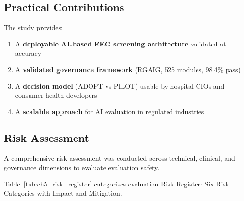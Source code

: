 \subsection{Practical Contributions}

The study provides:

\begin{enumerate}[label=(\alph*)]
    \item A \textbf{deployable AI-based EEG screening architecture} validated at \asdacc{} accuracy
    \item A \textbf{validated governance framework} (RGAIG, 525 modules, 98.4\% pass)
    \item A \textbf{decision model} (ADOPT vs PILOT) usable by hospital CIOs and consumer health developers
    \item A \textbf{scalable approach} for AI evaluation in regulated industries
\end{enumerate}


\subsection{Risk Assessment}

A comprehensive risk assessment was conducted across technical, clinical, and governance dimensions to evaluate evaluation safety.

\noindent Table~\ref{tab:ch5_risk_register} categorises evaluation Risk Register: Six Risk Categories with Impact and Mitigation.

